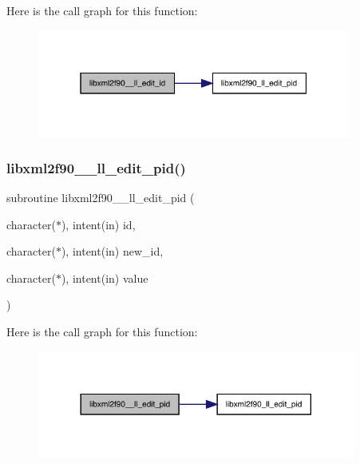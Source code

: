 Here is the call graph for this function\+:
\nopagebreak
\begin{figure}[H]
\begin{center}
\leavevmode
\includegraphics[width=292pt]{libxml2f90_8f90__pp_8f90_a3c214cdd6b674131bd309980b862b11d_cgraph}
\end{center}
\end{figure}
\mbox{\label{libxml2f90_8f90__pp_8f90_a7170975a9d7aeb275e0c6b9c7c809ead}} 
\subsubsection{\texorpdfstring{libxml2f90\+\_\+\+\_\+ll\+\_\+edit\+\_\+pid()}{libxml2f90\_\_ll\_edit\_pid()}}
{\footnotesize\ttfamily subroutine libxml2f90\+\_\+\+\_\+ll\+\_\+edit\+\_\+pid (\begin{DoxyParamCaption}\item[{character($\ast$), intent(in)}]{id,  }\item[{character($\ast$), intent(in)}]{new\+\_\+id,  }\item[{character($\ast$), intent(in)}]{value }\end{DoxyParamCaption})}

Here is the call graph for this function\+:
\nopagebreak
\begin{figure}[H]
\begin{center}
\leavevmode
\includegraphics[width=296pt]{libxml2f90_8f90__pp_8f90_a7170975a9d7aeb275e0c6b9c7c809ead_cgraph}
\end{center}
\end{figure}
\mbox{\label{libxml2f90_8f90__pp_8f90_a3693c7841e7cf085873b2193e4eb51cf}} 
